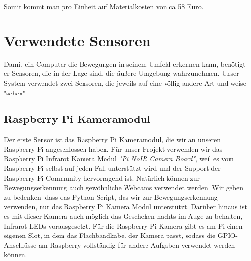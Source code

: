 \documentclass[12pt,a4paper]{scrreprt}
\begin{document}
Somit kommt man pro Einheit auf Materialkosten von ca 58 Euro.

\section{Verwendete Sensoren}
Damit ein Computer die Bewegungen in seinem Umfeld erkennen kann, benötigt er Sensoren, die in der Lage sind, die äußere Umgebung wahrzunehmen. Unser System verwendet zwei Sensoren, die jeweils auf eine völlig andere Art und weise "sehen". 

\subsection{Raspberry Pi Kameramodul}
Der erste Sensor ist das Raspberry Pi Kameramodul, die wir an unseren Raspberry Pi angeschlossen haben. Für unser Projekt verwenden wir das Raspberry Pi Infrarot Kamera Modul \textit{"Pi NoIR Camera Board"}, weil es vom Raspberry Pi selbst auf jeden Fall unterstützt wird und der Support der Raspberry Pi Community hervorragend ist. Natürlich können zur Bewegungserkennung auch gewöhnliche Webcams verwendet werden. Wir geben zu bedenken, dass das Python Script, das wir zur Bewegungserkennung verwenden, nur das Raspberry Pi Kamera Modul unterstützt. Darüber hinaus ist es mit dieser Kamera auch möglich das Geschehen nachts im Auge zu behalten, Infrarot-LEDs vorausgesetzt.
Für die Raspberry Pi Kamera gibt es am Pi einen eigenen Slot, in dem das Flachbandkabel der Kamera passt, sodass die GPIO-Anschlüsse am Raspberry vollständig für andere Aufgaben verwendet werden können.
\end{document}
